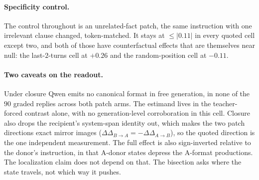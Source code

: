 \documentclass{article}
\begin{document}
\paragraph{Specificity control.}
The control throughout is an unrelated-fact patch, the same instruction with one irrelevant
clause changed, token-matched. It stays at $\le|0.11|$ in every quoted cell except two, and
both of those have counterfactual effects that are themselves near null: the last-$2$-turns
cell at $+0.26$ and the random-position cell at $-0.11$.

\paragraph{Two caveats on the readout.}
Under closure Qwen emits no canonical format in free generation, in none of the $90$ graded
replies across both patch arms. The estimand lives in the teacher-forced contrast
alone, with no generation-level corroboration in this cell. Closure also drops the recipient's
system-span identity out, which makes the two patch directions exact mirror images
($\Delta\Delta_{B\to A}=-\Delta\Delta_{A\to B}$), so the quoted direction is the one
independent measurement. The full effect is also sign-inverted relative to the donor's
instruction, in that A-donor states depress the A-format productions. The localization claim
does not depend on that. The bisection asks where the state travels, not which way it
pushes.
\end{document}

